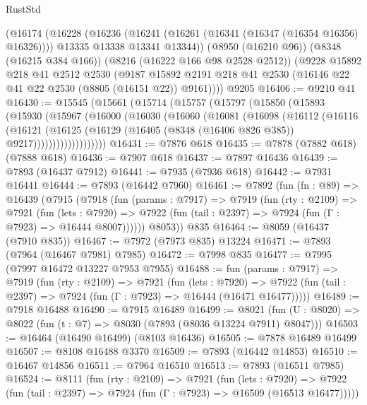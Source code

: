 \begin{lexlean}{RustStd}
\begin{coremodule}
    (@16174
      (@16228
        (@16236
          (@16241 (@16261 (@16341 (@16347 (@16354 @16356) @16326))))
          @13335
          @13338
          @13341
          @13344))
      (@8950 (@16210 @96))
      (@8348 (@16215 @384 @166))
      (@8216 (@16222 @166 @98 @2528 @2512))
      (@9228
        @15892
        @218
        @41
        @2512
        @2530
        (@9187 @15892 @2191 @218 @41 @2530 (@16146 @22 @41 @22 @2530 (@8805 (@16151 @22)) @9161))))
    @9205
@16406 := @9210 @41
@16430 := @15545
    (@15661
      (@15714
        (@15757
          (@15797
            (@15850
              (@15893
                (@15930
                  (@15967
                    (@16000
                      (@16030
                        (@16060
                          (@16081
                            (@16098
                              (@16112
                                (@16116
                                  (@16121
                                    (@16125
                                      (@16129
                                        (@16405 (@8348 (@16406 @826 @385)) @9217)))))))))))))))))))
@16431 := @7876 @618
@16435 := @7878 (@7882 @618) (@7888 @618)
@16436 := @7907 @618
@16437 := @7897 @16436
@16439 := @7893 (@16437 @7912)
@16441 := @7935 (@7936 @618)
@16442 := @7931 @16441
@16444 := @7893 (@16442 @7960)
@16461 := @7892
    (fun (fn : @89) =>
    @16439
      (@7915
        (@7918
          (fun (params : @7917) =>
          @7919
            (fun (rty : @2109) =>
            @7921
              (fun (lets : @7920) =>
              @7922 (fun (tail : @2397) => @7924 (fun (Γ : @7923) => @16444 @8007))))))
        @8053))
    @835
@16464 := @8059 (@16437 (@7910 @835))
@16467 := @7972 (@7973 @835) @13224
@16471 := @7893 (@7964 (@16467 @7981) @7985)
@16472 := @7998 @835
@16477 := @7995 (@7997 @16472 @13227 @7953 @7955)
@16488 := fun (params : @7917) =>
  @7919
    (fun (rty : @2109) =>
    @7921
      (fun (lets : @7920) =>
      @7922 (fun (tail : @2397) => @7924 (fun (Γ : @7923) => @16444 (@16471 @16477)))))
@16489 := @7918 @16488
@16490 := @7915 @16489
@16499 := @8021
    (fun (U : @8020) => @8022 (fun (t : @7) => @8030 (@7893 (@8036 @13224 @7911) @8047)))
@16503 := @16464 (@16490 @16499) (@8103 @16436)
@16505 := @7878 @16489 @16499
@16507 := @8108 @16488 @3370
@16509 := @7893 (@16442 @14853)
@16510 := @16467 @14856
@16511 := @7964 @16510
@16513 := @7893 (@16511 @7985)
@16524 := @8111
    (fun (rty : @2109) =>
    @7921
      (fun (lets : @7920) =>
      @7922 (fun (tail : @2397) => @7924 (fun (Γ : @7923) => @16509 (@16513 @16477)))))

\end{coremodule}
\end{lexlean}
